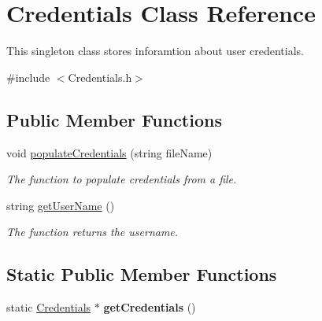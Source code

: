 \hypertarget{classCredentials}{\section{\-Credentials \-Class \-Reference}
\label{classCredentials}
}


\-This singleton class stores inforamtion about user credentials.  




{\ttfamily \#include $<$\-Credentials.\-h$>$}

\subsection*{\-Public \-Member \-Functions}
\begin{DoxyCompactItemize}
\item 
void \hyperlink{classCredentials_ac52b64e4ffc7fb48ac28ff0a8757cdda}{populate\-Credentials} (string file\-Name)
\begin{DoxyCompactList}\small\item\em \-The function to populate credentials from a file. \end{DoxyCompactList}\item 
string \hyperlink{classCredentials_abf4f819345764f63fc674e13b2569582}{get\-User\-Name} ()
\begin{DoxyCompactList}\small\item\em \-The function returns the username. \end{DoxyCompactList}\end{DoxyCompactItemize}
\subsection*{\-Static \-Public \-Member \-Functions}
\begin{DoxyCompactItemize}
\item 
\hypertarget{classCredentials_a35d6eed090b04c10c6cb04719eea61b7}{static \hyperlink{classCredentials}{\-Credentials} $\ast$ {\bfseries get\-Credentials} ()}\label{classCredentials_a35d6eed090b04c10c6cb04719eea61b7}

\end{DoxyCompactItemize}
